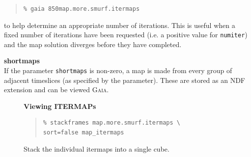 \documentclass[twoside,11pt]{article}
\newenvironment{latexonly}{}{}
\newcommand{\xref}[3]{#1}
\renewcommand{\_}{\texttt{\symbol{95}}}
\newenvironment{fmpage}[1]{\begin{lrbox}{\fmbox}\begin{minipage}{#1}}{\end{minipage}\end{lrbox}\fbox{\usebox{\fmbox}}}
\newenvironment{myquote}{\begin{quote}\begin{small}}{\end{small}\end{quote}}
\newcommand{\gaia}{\xref{\textsc{Gaia}}{sun214}{}}
\begin{document}
\begin{myquote}
\begin{verbatim}
% gaia 850map.more.smurf.itermaps
\end{verbatim}
\end{myquote}
to help determine an appropriate number of iterations. This is useful
when a fixed number of iterations have been requested (i.e. a positive
value for \texttt{numiter}) and the map solution diverges before
they have completed.

\textbf{shortmaps}\\
If the parameter \texttt{shortmaps} is non-zero, a map is made from
every group of adjacent timeslices (as specified by the parameter).
These are stored as an NDF extension and can be viewed \gaia.

\begin{latexonly}
\begin{figure}[ht!]
\begin{center}
\begin{fmpage}{0.95\linewidth}
\vspace{0.2cm}
\hspace{2mm}
\textbf{Viewing ITERMAPs}

\vspace{0.5cm}

\begin{minipage}[c]{0.65\linewidth}

\begin{myquote}
\begin{verbatim}
% stackframes map.more.smurf.itermaps \
sort=false map_itermaps
\end{verbatim}
\end{myquote}
\end{minipage}
\hspace{0.3cm}
\begin{minipage}[c]{0.29\linewidth}
Stack the individual itermaps into a single cube.
\end{minipage}

\vspace{0.5cm}


\end{fmpage}
\end{center}
\end{figure}
\end{latexonly}
\end{document}
